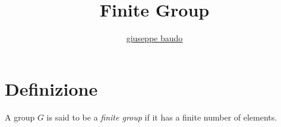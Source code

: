\documentclass[a4paper,10pt]{article}
\title{Finite Group}
\author{\href{http://www.baudo.hol.es}{giuseppe baudo}}
\begin{document}
\maketitle

\section{Definizione}
A group $G$ is said to be a \textit{finite group} if it has a finite number of elements.
\end{document}
